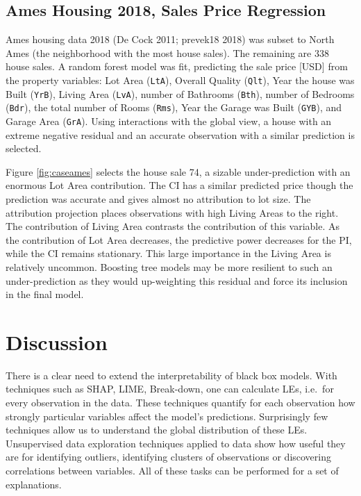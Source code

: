 \documentclass[
]{article}
\begin{document}
\hypertarget{ames-housing-2018-sales-price-regression}{%
\subsection{Ames Housing 2018, Sales Price Regression}\label{ames-housing-2018-sales-price-regression}}

Ames housing data 2018 (De Cock 2011; prevek18 2018) was subset to North Ames (the neighborhood with the most house sales). The remaining are 338 house sales. A random forest model was fit, predicting the sale price {[}USD{]} from the property variables: Lot Area (\texttt{LtA}), Overall Quality (\texttt{Qlt}), Year the house was Built (\texttt{YrB}), Living Area (\texttt{LvA}), number of Bathrooms (\texttt{Bth}), number of Bedrooms (\texttt{Bdr}), the total number of Rooms (\texttt{Rms}), Year the Garage was Built (\texttt{GYB}), and Garage Area (\texttt{GrA}). Using interactions with the global view, a house with an extreme negative residual and an accurate observation with a similar prediction is selected.

Figure \ref{fig:caseames} selects the house sale 74, a sizable under-prediction with an enormous Lot Area contribution. The CI has a similar predicted price though the prediction was accurate and gives almost no attribution to lot size. The attribution projection places observations with high Living Areas to the right. The contribution of Living Area contrasts the contribution of this variable. As the contribution of Lot Area decreases, the predictive power decreases for the PI, while the CI remains stationary. This large importance in the Living Area is relatively uncommon. Boosting tree models may be more resilient to such an under-prediction as they would up-weighting this residual and force its inclusion in the final model.

\hypertarget{sec:cheemdiscussion}{%
\section{Discussion}\label{sec:cheemdiscussion}}

There is a clear need to extend the interpretability of black box models. With techniques such as SHAP, LIME, Break-down, one can calculate LEs, i.e.~for every observation in the data. These techniques quantify for each observation how strongly particular variables affect the model's predictions. Surprisingly few techniques allow us to understand the global distribution of these LEs. Unsupervised data exploration techniques applied to data show how useful they are for identifying outliers, identifying clusters of observations or discovering correlations between variables. All of these tasks can be performed for a set of explanations.
\end{document}
